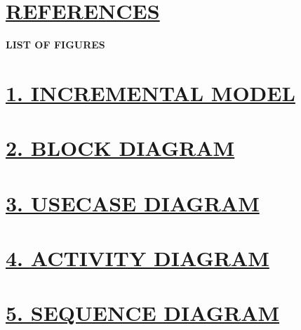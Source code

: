 \documentclass[a4paper,12pt]{article}
\begin{document}
								
		\section*{\fontsize{12}{14}\selectfont \hyperref[reference]{REFERENCES}\protect{}}









        
								
		\newpage
		\begin{flushleft}
			\fontsize{14}{16}\selectfont\textbf{LIST OF FIGURES}
			\label{LOF}
		\end{flushleft}
								
		\section*{\fontsize{12}{14}\selectfont \hyperref[incremental]{1. INCREMENTAL MODEL}\protect{}}
								
		\section*{\fontsize{12}{14}\selectfont \hyperref[block-diagram]{2. BLOCK DIAGRAM}\protect{}}
								
		\section*{\fontsize{12}{14}\selectfont \hyperref[usecase_diagram]{3. USECASE DIAGRAM}\protect{}}

  
  		\section*{\fontsize{12}{14}\selectfont \hyperref[activitydiagram]{4. ACTIVITY DIAGRAM}\protect{}}
								
		\section*{\fontsize{12}{14}\selectfont \hyperref[sequencediagram]{5. SEQUENCE DIAGRAM}\protect{}}
\end{document}
